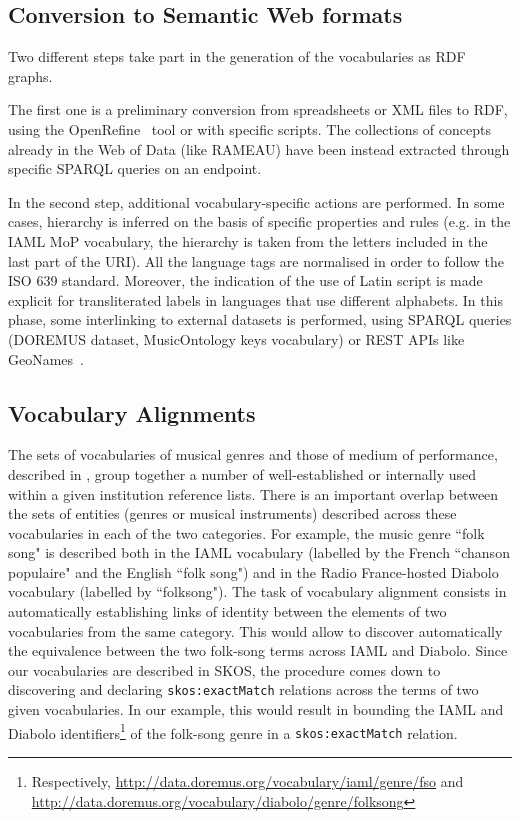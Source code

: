 \documentclass{article}
\begin{document}
\subsection{Conversion to Semantic Web formats}
Two different steps take part in the generation of the vocabularies as RDF graphs.

The first one is a preliminary conversion from spreadsheets or XML files to RDF, using the OpenRefine~\cite{ham2013openrefine} tool or with specific scripts. The collections of concepts already in the Web of Data (like RAMEAU) have been instead extracted through specific SPARQL queries on an endpoint.

In the second step, additional vocabulary-specific actions are performed. In some cases, hierarchy is inferred on the basis of specific properties and rules (e.g. in the IAML MoP vocabulary, the hierarchy is taken from the letters included in the last part of the URI).
All the language tags are normalised in order to follow the ISO 639 standard. Moreover, the indication of the use of Latin script is made explicit for transliterated labels in languages that use different alphabets.
In this phase, some interlinking to external datasets is performed, using SPARQL queries (DOREMUS dataset, MusicOntology keys vocabulary) or REST APIs like GeoNames~\cite{wick2012geonames}.

\subsection{Vocabulary Alignments}\label{sec:interlinking}
The sets of vocabularies of musical genres and those of medium of performance, described in , group together a number of well-established or internally used within a given institution reference lists. There is an important overlap between the sets of entities (genres or musical instruments) described across these vocabularies in each of the two categories. For example, the music genre ``folk song" is described both in the IAML vocabulary (labelled by the French ``chanson populaire" and the English ``folk song") and in the Radio France-hosted Diabolo vocabulary (labelled by ``folksong"). The task of vocabulary alignment consists in automatically establishing links of identity between the elements of two vocabularies from the same category. This would allow to discover automatically the equivalence between the two folk-song terms across IAML and Diabolo. Since our vocabularies are described in SKOS, the procedure comes down to discovering and declaring {\tt skos:exactMatch} relations across the terms of two given vocabularies. In our example, this would result in bounding the IAML and Diabolo identifiers\footnote{Respectively,
\url{http://data.doremus.org/vocabulary/iaml/genre/fso} 
and 
\url{http://data.doremus.org/vocabulary/diabolo/genre/folksong}
} of the folk-song genre in a  {\tt skos:exactMatch} relation.
\end{document}
